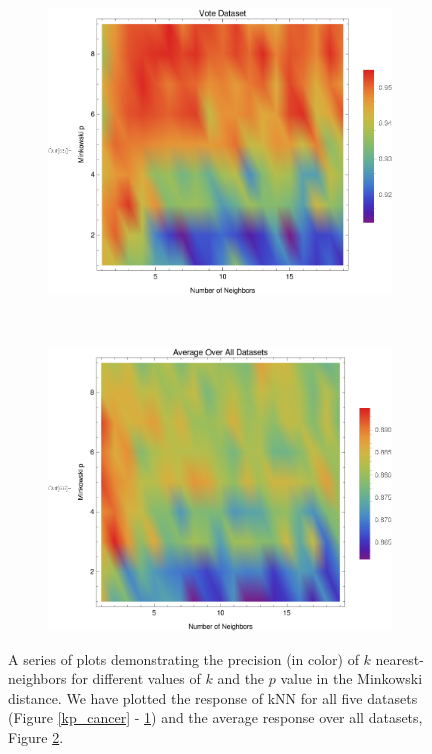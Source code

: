 \documentclass{article}
\begin{document}
\begin{figure}[h!]
\begin{subfigure}[b]{0.32\textwidth}
				\end{subfigure} \	
				\begin{subfigure}[b]{0.32\textwidth}
					\centering
					\includegraphics[width=\textwidth]{figs/kNN/vote_plot_kp}	
					\caption{}
					\label{kp_vote}				
				\end{subfigure} \	
				\begin{subfigure}[b]{0.32\textwidth}
					\centering
					\includegraphics[width=\textwidth]{figs/kNN/average_plot_kp}	
					\caption{}
					\label{kp_ave}				
				\end{subfigure}
				\caption{A series of plots demonstrating the precision (in color) of $k$ nearest-neighbors for different values of $k$ and the $p$ value in the Minkowski distance. We have plotted the response of kNN for all five datasets (Figure \ref{kp_cancer} - \ref{kp_vote}) and the average response over all datasets, Figure \ref{kp_ave}.}
				\label{kp_plot}
			\end{figure}
		
\end{document}
